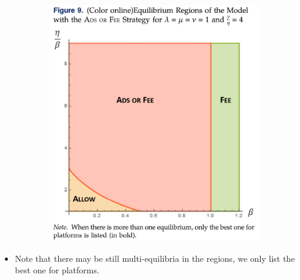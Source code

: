 \documentclass{beamer}
\begin{document}
\begin{frame}
\begin{figure}
\begin{subfigure}[b]{0.3\textwidth}
        \end{subfigure}
        \hfill
        \begin{subfigure}[b]{0.3\textwidth}
            \centering
            \includegraphics[width=\textwidth]{f9}
        \end{subfigure}
    \end{figure}
    \begin{itemize}
        \item Note that there may be still multi-equilibria in the regions,
            we only list the best one for platforms.
    \end{itemize}
\end{frame}
\end{document}
